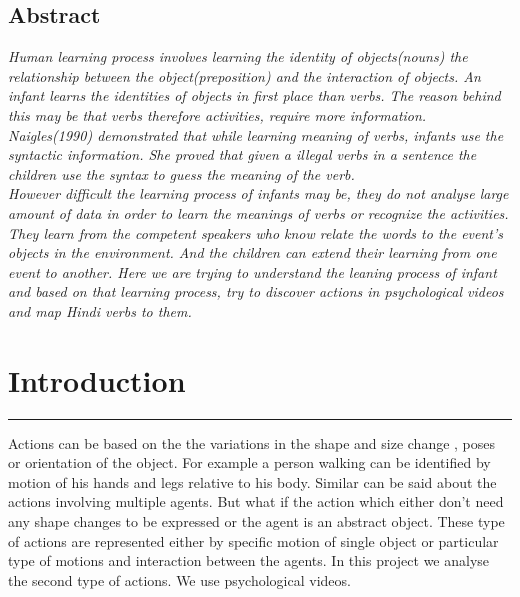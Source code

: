 \documentclass[a4paper, 10pt, notitlepage]{report}
\begin{document}
\tableofcontents 

\newpage
\section*{Abstract}
{\it
Human learning process involves learning the identity of objects(nouns) the relationship between the object(preposition) and the interaction of objects. An infant learns the identities of objects in first place than verbs. The reason behind this may be that verbs therefore activities, require more information. Naigles(1990)\cite{naigles} demonstrated that while learning meaning of verbs, infants use the syntactic information. She proved that given a illegal verbs in a sentence the children use the syntax to guess the meaning of the verb. \\
\hspace*{10pt} However difficult the learning process of infants may be, they do not analyse large amount of data in order to learn the meanings of verbs or recognize the activities. They learn from the competent speakers who know relate the words to the event's objects in the environment.\cite{kerr-cohen-08_wubble-world-lang-acquisition} And the children can extend their learning from one event to another. 
\hspace*{10pt} Here we are trying to understand the leaning process of infant and based on that learning process, try to discover actions in psychological videos and map Hindi verbs to them.
}

\chapter{Introduction}
\hrule height 2pt
\vspace*{10pt} 
 Actions can be based on the the variations in the shape and size change , poses\cite{pami-Ben-ArieWPR02}  or orientation of the object. For example a person walking can be identified by motion of his hands and legs relative to his body. Similar can be said about the actions involving multiple agents. But what if the action which either don't need any shape changes to be expressed or the agent is an abstract object. These type of actions are represented either by specific motion of single object or particular type of motions and interaction between the agents. In this project we analyse the second type of actions. We use psychological videos\cite{fhanimation}. \\
\end{document}
